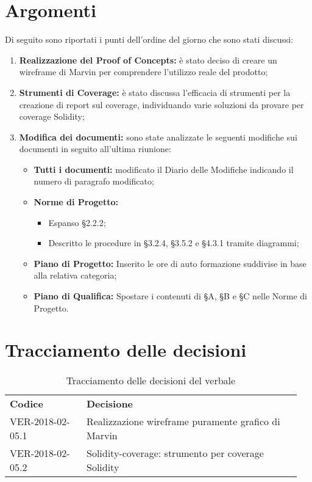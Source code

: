 \documentclass[VER-2018-05-02.tex]{subfiles}
\begin{document}
\section{Argomenti}
Di seguito sono riportati i punti dell'ordine del giorno che sono stati discussi:
\begin{enumerate}
	\item \textbf{Realizzazione del Proof of Concepts:} è stato deciso di creare un wireframe di Marvin per comprendere l'utilizzo reale del prodotto;
	\item \textbf{Strumenti di Coverage:} è stato discussa l'efficacia di strumenti per la creazione di report sul coverage, individuando varie soluzioni da provare per coverage Solidity;	
	\item \textbf{Modifica dei documenti:} sono state analizzate le seguenti modifiche sui documenti in seguito all'ultima riunione:
	\begin{itemize}
		\item \textbf{Tutti i documenti:} modificato il Diario delle Modifiche indicando il numero di paragrafo modificato;
		\item \textbf{Norme di Progetto:} \begin{itemize}
										     \item Espanso \S 2.2.2;
										     \item Descritto le procedure in \S 3.2.4, \S 3.5.2 e \S 4.3.1 tramite diagrammi;
								           \end{itemize}
      \item \textbf{Piano di Progetto:} Inserito le ore di auto formazione suddivise in base alla relativa categoria;
      \item\textbf{Piano di Qualifica:} Spostare i contenuti di \S A, \S B e \S C nelle Norme di Progetto.
	\end{itemize}
\end{enumerate}

\section{Tracciamento delle decisioni}
\begin{table}[H]
	\begin{center}
		\begin{tabu} to 
			\tableHeaderStyle
			\textbf{Codice} & \textbf{Decisione} \\
			VER-2018-02-05.1 & Realizzazione wireframe puramente grafico di Marvin \\
			VER-2018-02-05.2 & Solidity-coverage: strumento per coverage Solidity \\
		\end{tabu}
		\caption{Tracciamento delle decisioni del verbale}
	\end{center}
\end{table}
\end{document}
